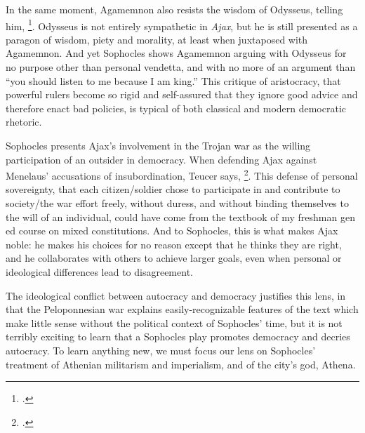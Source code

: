 
In the same moment, Agamemnon also resists the wisdom of Odysseus, telling him,
 \footcite[l. 1352]{ajax}. Odysseus is not entirely sympathetic in \textit{Ajax},
but he is still presented as a paragon of wisdom, piety and morality, at least when
juxtaposed with Agamemnon. And yet Sophocles shows Agamemnon arguing with Odysseus for no
purpose other than personal vendetta, and with no more of an argument than \enquote{you
should listen to me because I am king.} This critique of aristocracy, that powerful rulers
become so rigid and self-assured that they ignore good advice and therefore enact bad
policies, is typical of both classical and modern democratic rhetoric.


Sophocles presents Ajax's involvement in the Trojan war as the willing participation of an
outsider in democracy. When defending Ajax against Menelaus' accusations of
insubordination, Teucer says,  \footcite[ll. 1099--1104]{ajax}. This defense of personal sovereignty, that each
citizen/soldier chose to participate in and contribute to society/the war effort freely,
without duress, and without binding themselves to the will of an individual, could have
come from the textbook of my freshman gen ed course on mixed constitutions. And to
Sophocles, this is what makes Ajax noble: he makes his choices for no reason except that
he thinks they are right, and he collaborates with others to achieve larger goals, even
when personal or ideological differences lead to disagreement.

The ideological conflict between autocracy and democracy justifies this lens, in that the
Peloponnesian war explains easily-recognizable features of the text which make little
sense without the political context of Sophocles' time, but it is not terribly exciting to
learn that a Sophocles play promotes democracy and decries autocracy. To learn anything
new, we must focus our lens on Sophocles' treatment of Athenian militarism and
imperialism, and of the city's god, Athena.


